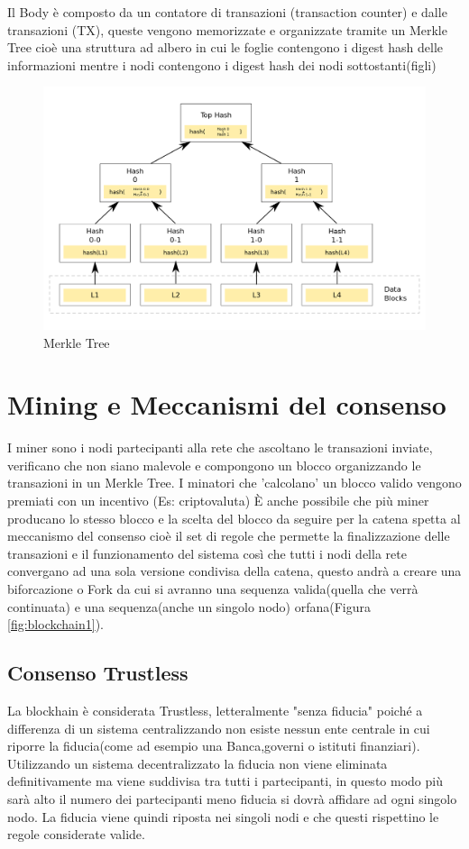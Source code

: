 \documentclass[12pt]{report}
\begin{document}
Il Body è composto da un contatore di transazioni (transaction counter) e dalle transazioni (TX), queste vengono memorizzate e organizzate tramite un Merkle Tree cioè una struttura ad albero in cui le foglie contengono i digest hash delle informazioni mentre i nodi contengono i digest hash dei nodi sottostanti(figli)
\begin{figure}[h]
	\includegraphics[width=\textwidth]{Hash_Tree}
	\centering
	\caption{Merkle Tree}
	\label{fig:Tree1}
\end{figure}

\section{Mining e Meccanismi del consenso}
I miner sono i nodi partecipanti alla rete che  ascoltano le transazioni inviate, verificano che non siano malevole e compongono un blocco organizzando le transazioni in un Merkle Tree.
I minatori che 'calcolano' un blocco valido vengono premiati con un incentivo (Es: criptovaluta)
È anche possibile che più miner producano lo stesso blocco e la scelta del blocco da seguire per la catena spetta al meccanismo del consenso cioè  il set di regole che permette la finalizzazione delle transazioni e il funzionamento del sistema così che tutti i nodi della rete convergano ad una sola versione condivisa della catena, questo andrà a creare una biforcazione o Fork da cui si avranno una sequenza valida(quella che verrà continuata) e una sequenza(anche un singolo nodo) orfana(Figura \ref{fig:blockchain1}).

\subsection{Consenso Trustless}
La blockhain è considerata Trustless, letteralmente "senza fiducia" poiché a differenza di un sistema centralizzando non esiste nessun ente centrale in cui riporre la fiducia(come ad esempio una Banca,governi o istituti finanziari). Utilizzando un sistema decentralizzato la fiducia non viene eliminata definitivamente ma viene suddivisa tra tutti i partecipanti, in questo modo più sarà alto il numero dei partecipanti meno fiducia si dovrà affidare ad ogni singolo nodo. La fiducia viene quindi riposta nei singoli nodi e che questi rispettino le regole considerate valide.
\end{document}
